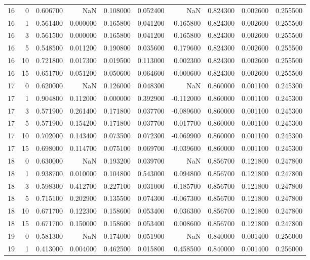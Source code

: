 \begin{table}
\begin{tabular}{rrrrrrrrrr}
16 & 0 & 0.606700 & NaN & 0.108000 & 0.052400 & NaN & 0.824300 & 0.002600 & 0.255500 \\
16 & 1 & 0.561400 & 0.000000 & 0.165800 & 0.041200 & 0.165800 & 0.824300 & 0.002600 & 0.255500 \\
16 & 3 & 0.561500 & 0.000000 & 0.165800 & 0.041200 & 0.165800 & 0.824300 & 0.002600 & 0.255500 \\
16 & 5 & 0.548500 & 0.011200 & 0.190800 & 0.035600 & 0.179600 & 0.824300 & 0.002600 & 0.255500 \\
16 & 10 & 0.721800 & 0.017300 & 0.019500 & 0.113000 & 0.002300 & 0.824300 & 0.002600 & 0.255500 \\
16 & 15 & 0.651700 & 0.051200 & 0.050600 & 0.064600 & -0.000600 & 0.824300 & 0.002600 & 0.255500 \\
17 & 0 & 0.620000 & NaN & 0.126000 & 0.048300 & NaN & 0.860000 & 0.001100 & 0.245300 \\
17 & 1 & 0.904800 & 0.112000 & 0.000000 & 0.392900 & -0.112000 & 0.860000 & 0.001100 & 0.245300 \\
17 & 3 & 0.571900 & 0.261400 & 0.171800 & 0.037700 & -0.089600 & 0.860000 & 0.001100 & 0.245300 \\
17 & 5 & 0.571900 & 0.154200 & 0.171800 & 0.037700 & 0.017700 & 0.860000 & 0.001100 & 0.245300 \\
17 & 10 & 0.702000 & 0.143400 & 0.073500 & 0.072300 & -0.069900 & 0.860000 & 0.001100 & 0.245300 \\
17 & 15 & 0.698000 & 0.114700 & 0.075100 & 0.069700 & -0.039600 & 0.860000 & 0.001100 & 0.245300 \\
18 & 0 & 0.630000 & NaN & 0.193200 & 0.039700 & NaN & 0.856700 & 0.121800 & 0.247800 \\
18 & 1 & 0.938700 & 0.010000 & 0.104800 & 0.543000 & 0.094800 & 0.856700 & 0.121800 & 0.247800 \\
18 & 3 & 0.598300 & 0.412700 & 0.227100 & 0.031000 & -0.185700 & 0.856700 & 0.121800 & 0.247800 \\
18 & 5 & 0.715100 & 0.202900 & 0.135500 & 0.074300 & -0.067300 & 0.856700 & 0.121800 & 0.247800 \\
18 & 10 & 0.671700 & 0.122300 & 0.158600 & 0.053400 & 0.036300 & 0.856700 & 0.121800 & 0.247800 \\
18 & 15 & 0.671700 & 0.150000 & 0.158600 & 0.053400 & 0.008600 & 0.856700 & 0.121800 & 0.247800 \\
19 & 0 & 0.581300 & NaN & 0.174000 & 0.051900 & NaN & 0.840000 & 0.001400 & 0.256000 \\
19 & 1 & 0.413000 & 0.004000 & 0.462500 & 0.015800 & 0.458500 & 0.840000 & 0.001400 & 0.256000 \\

\end{tabular}
\end{table}
